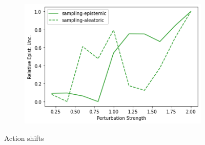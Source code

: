 \begin{figure}
\begin{subfigure}{.24\textwidth}
    \end{subfigure}
    \begin{subfigure}{.24\textwidth}
        \includegraphics[width=\textwidth]{sections/011_icml2022/resources/action_shift-PostNet-LunarLanderShift-v0-mean_epistemic_uncertainty_.png}
    \end{subfigure}
    \vspace{-3mm}
    \caption*{Action shifts}
    \vspace{2mm}


\end{figure}
